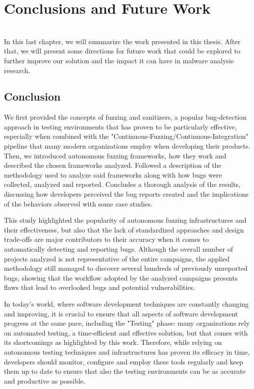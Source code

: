 \chapter{Conclusions and Future Work} \label{chap_5}
\ \\

In this last chapter, we will summarize the work presented in this thesis. After that, we will present some directions for future work that could be explored to further improve our solution and the impact it can have in malware analysis research.

\section{Conclusion}
We first provided the concepts of fuzzing and sanitizers, a popular bug-detection approach in testing environments that has proven to be particularly effective, especially when combined with the "Continuous-Fuzzing/Continuous-Integration" pipeline that many modern organizations employ when developing their products. Then, we introduced autonomous fuzzing frameworks, how they work and described the chosen frameworks analyzed. Followed a description of the methodology used to analyze said frameworks along with how bugs were collected, analyzed and reported. Concludes a thorough analysis of the results, discussing how developers perceived the bug reports created and the implications of the behaviors observed with some case studies.

This study highlighted the popularity of autonomous fuzzing infrastructures and their effectiveness, but also that the lack of standardized approaches and design trade-offs are major contributors to their accuracy when it comes to automatically detecting and reporting bugs. Although the overall number of projects analyzed is not representative of the entire campaigns, the applied methodology still managed to discover several hundreds of previously unreported bugs, showing that the workflow adopted by the analyzed campaigns presents flaws that lead to overlooked bugs and potential vulnerabilities.

In today's world, where software development techniques are constantly changing and improving, it is crucial to ensure that all aspects of software development progress at the same pace, including the "Testing" phase: many organizations rely on automated testing, a time-efficient and effective solution, but that comes with its shortcomings as highlighted by this work. Therefore, while relying on autonomous testing techniques and infrastructures has proven its efficacy in time, developers should monitor, configure and employ these tools regularly and keep them up to date to ensure that also the testing environments can be as accurate and productive as possible.


